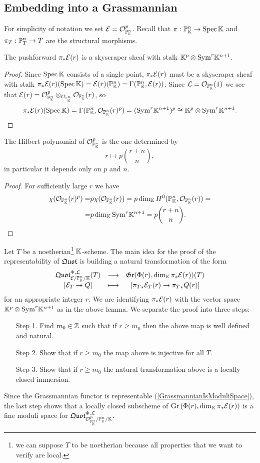 \subsection{Embedding into a Grassmannian}
For simplicity of notation we set $\mathcal{E}=\mathcal{O}^p_{\mathbb{P}^n_{\mathbb{K}}}$. Recall that $\pi:\mathbb{P}^n_{\mathbb{K}}\to \mathrm{Spec}\, \mathbb{K}$ and $\pi_T:\mathbb{P}^n_T\to T$ are the structural morphisms.
\begin{lemma}\label{PushforwardEr}
The pushforward
$\pi_\ast\mathcal{E}(r)$ is a skyscraper sheaf with stalk $\mathbb{K}^p\otimes \mathrm{Sym}^r\mathbb{K}^{n+1}$.
\end{lemma}
\begin{proof}
Since $\mathrm{Spec}\,\mathbb{K}$ consists of a single point, $\pi_\ast\mathcal{E}(r)$ must be a skyscraper sheaf with stalk $\pi_\ast\mathcal{E}(r)(\mathrm{Spec}\,\mathbb{K})=\mathcal{E}(r)(\mathbb{P}^n_{\mathbb{K}})=\Gamma(\mathbb{P}^n_{\mathbb{K}},\mathcal{E}(r))$. Since $\mathcal{L}=\mathcal{O}_{\mathbb{P}^n_{\mathbb{K}}}(1)$ we see that $\mathcal{E}(r)=\mathcal{O}_{\mathbb{P}^n_{\mathbb{K}}}^p\otimes_{\mathcal{O}_{\mathbb{P}^n_{\mathbb{K}}}}\mathcal{O}_{\mathbb{P}^n_{\mathbb{K}}}(r)$, so
\[\pi_\ast\mathcal{E}(r)(\mathrm{Spec}\,\mathbb{K})=\Gamma(\mathbb{P}^n_{\mathbb{K}},\mathcal{O}_{\mathbb{P}^n_{\mathbb{K}}}(r)^p)=(\mathrm{Sym}^r\mathbb{K}^{n+1})^p\cong \mathbb{K}^p\otimes\mathrm{Sym}^r\mathbb{K}^{n+1}.\]
\end{proof}

\begin{lemma}\label{HilbetPolynomialOfProjectiveSpace}
The Hilbert polynomial of $\mathcal{O}_{\mathbb{P}^n_{\mathbb{K}}}^p$ is the one determined by
\[r\mapsto p\binom{r+n}n,\]
in particular it depends only on $p$ and $n$.
\end{lemma}
\begin{proof}
For sufficiently large $r$ we have
\begin{align*}
\chi(\mathcal{O}_{\mathbb{P}^n_{\mathbb{K}}}(r)^p)=&p\chi(\mathcal{O}_{\mathbb{P}^n_{\mathbb{K}}}(r))=p\dim_{\mathbb{K}} H^0(\mathbb{P}^n_{\mathbb{K}},\mathcal{O}_{\mathbb{P}^n_{\mathbb{K}}}(r))=\\
=&p\dim_{\mathbb{K}} \mathrm{Sym}^r \mathbb{K}^{n+1}=p\binom{r+n}n.
\end{align*}
\end{proof}


Let $T$ be a noetherian\footnote{we can suppose $T$ to be noetherian because all properties that we want to verify are local.} $\mathbb{K}$-scheme. The main idea for the proof of the representability of $\mathfrak{Quot}$ is building a natural transformation of the form
\[\begin{array}{ccc} {\mathfrak{Quot}^{\Phi,\mathcal{L}}_{\mathcal{E}/\mathbb{P}^n_{\mathbb{K}}/\mathbb{K}}(T)} & \longrightarrow & {\mathfrak{Gr}(\Phi(r),\dim_{\mathbb{K}}\pi_\ast\mathcal{E}(r))(T)}\\ {[\mathcal{E}_T\twoheadrightarrow Q]} & \longmapsto & {[{\pi_T}_\ast\mathcal{E}_T(r)\to {\pi_T}_\ast Q(r)]} \end{array}\]
for an appropriate integer $r$. We are identifying $\pi_\ast\mathcal{E}(r)$ with the vector space $\mathbb{K}^p\otimes\mathrm{Sym}^r\mathbb{K}^{n+1}$ as in the above lemma. We separate the proof into three steps:
\setlength{\leftmargini}{1.3cm}
\begin{enumerate}
\item[Step 1.] Find $m_0\in\mathbb{Z}$ such that if $r\geq m_0$ then the above map is well defined and natural.
\item[Step 2.] Show that if $r\geq m_0$ the map above is injective for all $T$.
\item[Step 3.] Show that if $r\geq m_0$ the natural transformation above is a locally closed immersion.
\end{enumerate}
\setlength{\leftmargini}{0.5cm}
Since the Grassmannian functor is representable (\ref{GrassmannianIsModuliSpace}), the last step shows that a locally closed subscheme of $\mathrm{Gr}\left({\Phi(r), \dim_{\mathbb{K}}\pi_\ast\mathcal{E}(r)}\right)$ is a fine moduli space for $\mathfrak{Quot}^{\Phi,\mathcal{L}}_{\mathcal{O}^p_{\mathbb{P}^n_{\mathbb{K}}}/\mathbb{P}^n_{\mathbb{K}}/\mathbb{K}}$.


